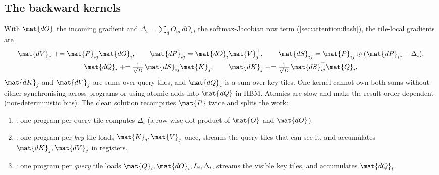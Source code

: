 \subsection{The backward kernels}

With $\mat{dO}$ the incoming gradient and $\Delta_i=\sum_d O_{id}\,dO_{id}$ the softmax-Jacobian
row term (\cref{sec:attention:flash}), the tile-local gradients are
\begin{gather}
\mat{dV}_j \mathrel{+}= \mat{P}_{ij}^{\top}\mat{dO}_i,\qquad
\mat{dP}_{ij}=\mat{dO}_i\mat{V}_j^{\top},\qquad
\mat{dS}_{ij}=\mat{P}_{ij}\odot(\mat{dP}_{ij}-\Delta_i),\nonumber\\
\mat{dQ}_i \mathrel{+}= \tfrac{1}{\sqrt D}\,\mat{dS}_{ij}\mat{K}_j,\qquad
\mat{dK}_j \mathrel{+}= \tfrac{1}{\sqrt D}\,\mat{dS}_{ij}^{\top}\mat{Q}_i .
\label{eq:perf:fa2bwd}
\end{gather}
$\mat{dK}_j$ and $\mat{dV}_j$ are sums over query tiles, and $\mat{dQ}_i$ is a sum over key tiles.
One kernel cannot own both sums without either synchronising across programs or using atomic
adds into $\mat{dQ}$ in HBM. Atomics are slow and make the result order-dependent (non-deterministic
bits). The clean solution recomputes $\mat{P}$ twice and splits the work:

\begin{enumerate}
\item {}: one program per query tile computes $\Delta_i$ (a row-wise dot
  product of $\mat{O}$ and $\mat{dO}$).
\item {}: one program per \emph{key} tile loads $\mat{K}_j,\mat{V}_j$ once,
  streams the query tiles that can see it, and accumulates $\mat{dK}_j,\mat{dV}_j$ in registers.
\item {}: one program per \emph{query} tile loads $\mat{Q}_i,\mat{dO}_i,L_i,\Delta_i$,
  streams the visible key tiles, and accumulates $\mat{dQ}_i$.
\end{enumerate}

